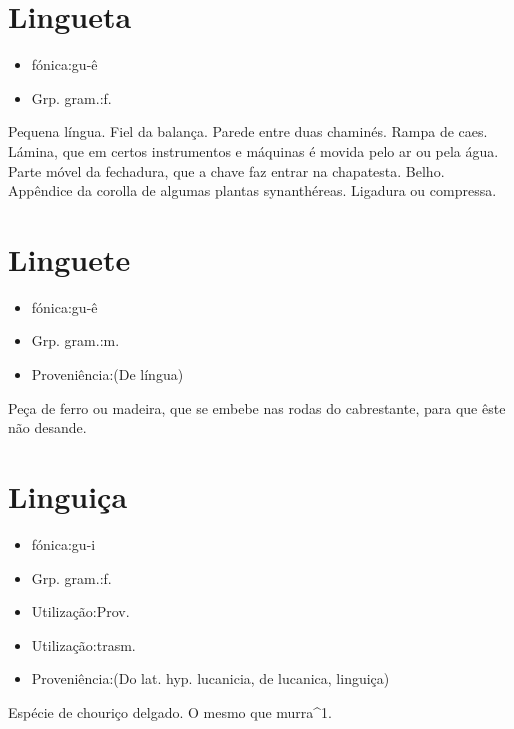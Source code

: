 \section{Lingueta}
\begin{itemize}
\item {fónica:gu-ê}
\end{itemize}
\begin{itemize}
\item {Grp. gram.:f.}
\end{itemize}
Pequena língua.
Fiel da balança.
Parede entre duas chaminés.
Rampa de caes.
Lámina, que em certos instrumentos e máquinas é movida pelo ar ou pela água.
Parte móvel da fechadura, que a chave faz entrar na chapatesta.
Belho.
Appêndice da corolla de algumas plantas synanthéreas.
Ligadura ou compressa.
\section{Linguete}
\begin{itemize}
\item {fónica:gu-ê}
\end{itemize}
\begin{itemize}
\item {Grp. gram.:m.}
\end{itemize}
\begin{itemize}
\item {Proveniência:(De \textunderscore língua\textunderscore )}
\end{itemize}
Peça de ferro ou madeira, que se embebe nas rodas do cabrestante, para que êste não desande.
\section{Linguiça}
\begin{itemize}
\item {fónica:gu-i}
\end{itemize}
\begin{itemize}
\item {Grp. gram.:f.}
\end{itemize}
\begin{itemize}
\item {Utilização:Prov.}
\end{itemize}
\begin{itemize}
\item {Utilização:trasm.}
\end{itemize}
\begin{itemize}
\item {Proveniência:(Do lat. hyp. \textunderscore lucanicia\textunderscore , de \textunderscore lucanica\textunderscore , linguiça)}
\end{itemize}
Espécie de chouriço delgado.
O mesmo que \textunderscore murra\textunderscore ^1.
